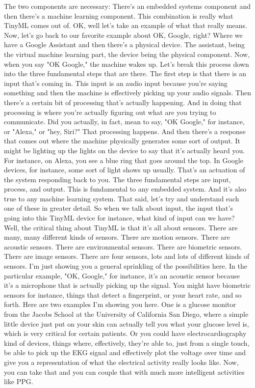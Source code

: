 The two components are necessary:
There's an embedded systems component and then there's a machine learning component.
This combination is really what TinyML comes out of.
OK, well let's take an example of what that really means.
Now, let's go back to our favorite example about OK, Google, right?
Where we have a Google Assistant and then there's a physical device.
The assistant, being the virtual machine learning part, the device being the physical component.
Now, when you say "OK Google," the machine wakes up.
Let's break this process down into the three fundamental steps that are there.
The first step is that there is an input that's coming in.
This input is an audio input because you're saying something and then the machine is effectively picking up your audio signals.
Then there's a certain bit of processing that's actually happening.
And in doing that processing is where you're actually figuring out what are you trying to communicate.
Did you actually, in fact, mean to say, "OK Google," for instance, or "Alexa," or "hey, Siri?"
That processing happens.
And then there's a response that comes out where the machine physically generates some sort of output.
It might be lighting up the lights on the device to say that it's actually heard you.
For instance, on Alexa, you see a blue ring that goes around the top.
In Google devices, for instance, some sort of light shows up usually.
That's an actuation of the system responding back to you.
The three fundamental steps are input, process, and output.
This is fundamental to any embedded system.
And it's also true to any machine learning system.
That said, let's try and understand each one of these in greater detail.
So when we talk about input, the input that's going into this TinyML device for instance, what kind of input can we have?
Well, the critical thing about TinyML is that it's all about sensors.
There are many, many different kinds of sensors.
There are motion sensors.
There are acoustic sensors.
There are environmental sensors.
There are biometric sensors.
There are image sensors.
There are four sensors, lots and lots of different kinds of sensors.
I'm just showing you a general sprinkling of the possibilities here.
In the particular example, "OK, Google," for instance, it's an acoustic sensor because it's a microphone that is actually picking up the signal.
You might have biometric sensors for instance, things that detect a fingerprint, or your heart rate, and so forth.
Here are two examples I'm showing you here.
One is a glucose monitor from the Jacobs School at the University of California San Diego, where a simple little device just put on your skin can actually tell you what your glucose level is, which is very critical for certain patients.
Or you could have electrocardiography kind of devices, things where, effectively, they're able to, just from a single touch, be able to pick up the EKG signal and effectively plot the voltage over time and give you a representation of what the electrical activity really looks like.
Now, you can take that and you can couple that with much more intelligent activities like PPG.




